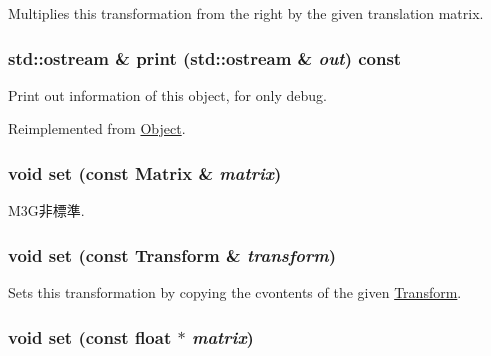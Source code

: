 Multiplies this transformation from the right by the given translation matrix. \hypertarget{classm3g_1_1Transform_6fea17fa1532df3794f8cb39cb4f911f}{
\subsubsection[{print}]{\setlength{\rightskip}{0pt plus 5cm}std::ostream \& print (std::ostream \& {\em out}) const}}
\label{classm3g_1_1Transform_6fea17fa1532df3794f8cb39cb4f911f}


Print out information of this object, for only debug. 

Reimplemented from \hyperlink{classm3g_1_1Object_6fea17fa1532df3794f8cb39cb4f911f}{Object}.\hypertarget{classm3g_1_1Transform_18ea3e0bff5da78a203fa770a5cfee97}{
\subsubsection[{set}]{\setlength{\rightskip}{0pt plus 5cm}void set (const {\bf Matrix} \& {\em matrix})}}
\label{classm3g_1_1Transform_18ea3e0bff5da78a203fa770a5cfee97}


M3G非標準. \hypertarget{classm3g_1_1Transform_8926ff19517a76de8f938025e9d3163d}{
\subsubsection[{set}]{\setlength{\rightskip}{0pt plus 5cm}void set (const {\bf Transform} \& {\em transform})}}
\label{classm3g_1_1Transform_8926ff19517a76de8f938025e9d3163d}


Sets this transformation by copying the cvontents of the given \hyperlink{classm3g_1_1Transform}{Transform}. \hypertarget{classm3g_1_1Transform_d1a2203142a848286c80d66c8c7fa37d}{
\subsubsection[{set}]{\setlength{\rightskip}{0pt plus 5cm}void set (const float $\ast$ {\em matrix})}}
\label{classm3g_1_1Transform_d1a2203142a848286c80d66c8c7fa37d}


